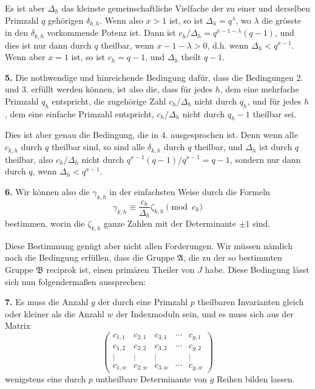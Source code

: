 \documentclass[12pt,a4paper]{article}
\theoremstyle{plain}
\theoremstyle{definition}
\theoremstyle{remark}
\begin{document}
Es ist aber $\Delta_h$ das kleinste gemeinschaftliche Vielfache der zu einer und derselben Primzahl $q$ gehörigen $\delta_{k,h}$. Wenn also $x > 1$ ist, so ist $\Delta_h = q^\lambda$, wo $\lambda$ die grösste in den $\delta_{k,h}$ vorkommende Potenz ist. Dann ist $c_h/\Delta_h = q^{x-1-\lambda}(q-1)$, und dies ist nur dann durch $q$ theilbar, wenn $x-1-\lambda > 0$, d.h. wenn $\Delta_h < q^{x-1}$. Wenn aber $x=1$ ist, so ist $c_h = q-1$, und $\Delta_h$ theilt $q-1$.

\medskip\noindent\textbf{5.} Die nothwendige und hinreichende Bedingung dafür, dass die Bedingungen 2. und 3. erfüllt werden können, ist also die, dass für jedes $h$, dem eine mehrfache Primzahl $q_h$ entspricht, die zugehörige Zahl $c_h/\Delta_h$ nicht durch $q_h$, und für jedes $h$, dem eine einfache Primzahl entspricht, $c_h/\Delta_h$ nicht durch $q_h-1$ theilbar sei.

\medskip
Dies ist aber genau die Bedingung, die in 4. ausgesprochen ist. Denn wenn alle $c_{k,h}$ durch $q$ theilbar sind, so sind alle $\delta_{k,h}$ durch $q$ theilbar, und $\Delta_h$ ist durch $q$ theilbar, also $c_h/\Delta_h$ nicht durch $q^{x-1}(q-1)/q^{x-1} = q-1$, sondern nur dann durch $q$, wenn $\Delta_h < q^{x-1}$.

\medskip\noindent\textbf{6.} Wir können also die $\gamma_{k,h}$ in der einfachsten Weise durch die Formeln
\begin{equation}\tag{17}
\gamma_{k,h} \equiv \frac{c_h}{\Delta_h} \zeta_{k,h} \pmod{c_h}
\end{equation}
bestimmen, worin die $\zeta_{k,h}$ ganze Zahlen mit der Determinante $\pm 1$ sind.

\medskip
Diese Bestimmung genügt aber nicht allen Forderungen. Wir müssen nämlich noch die Bedingung erfüllen, dass die Gruppe $\mathfrak{A}$, die zu der so bestimmten Gruppe $\mathfrak{B}$ reciprok ist, einen primären Theiler von $J$ habe. Diese Bedingung lässt sich nun folgendermaßen aussprechen:

\medskip\noindent\textbf{7.} Es muss die Anzahl $g$ der durch eine Primzahl $p$ theilbaren Invarianten gleich oder kleiner als die Anzahl $w$ der Indexmoduln sein, und es muss sich aus der Matrix
\begin{equation}\tag{24}
\begin{pmatrix}
c_{1,1} & c_{2,1} & c_{3,1} & \cdots & c_{g,1} \\
c_{1,2} & c_{2,2} & c_{3,2} & \cdots & c_{g,2} \\
\vdots & \vdots & \vdots & & \vdots \\
c_{1,w} & c_{2,w} & c_{3,w} & \cdots & c_{g,w}
\end{pmatrix}
\end{equation}
wenigstens eine durch $p$ untheilbare Determinante von $g$ Reihen bilden lassen.
\end{document}
